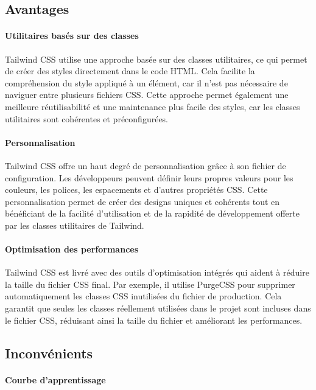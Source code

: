 \subsection{Avantages}

\paragraph{Utilitaires basés sur des classes}

Tailwind CSS utilise une approche basée sur des classes utilitaires, ce qui permet de créer des styles directement dans le code HTML. Cela facilite la compréhension du style appliqué à un élément, car il n'est pas nécessaire de naviguer entre plusieurs fichiers CSS. Cette approche permet également une meilleure réutilisabilité et une maintenance plus facile des styles, car les classes utilitaires sont cohérentes et préconfigurées.

\paragraph{Personnalisation}

Tailwind CSS offre un haut degré de personnalisation grâce à son fichier de configuration. Les développeurs peuvent définir leurs propres valeurs pour les couleurs, les polices, les espacements et d'autres propriétés CSS. Cette personnalisation permet de créer des designs uniques et cohérents tout en bénéficiant de la facilité d'utilisation et de la rapidité de développement offerte par les classes utilitaires de Tailwind.

\paragraph{Optimisation des performances}

Tailwind CSS est livré avec des outils d'optimisation intégrés qui aident à réduire la taille du fichier CSS final. Par exemple, il utilise PurgeCSS pour supprimer automatiquement les classes CSS inutilisées du fichier de production. Cela garantit que seules les classes réellement utilisées dans le projet sont incluses dans le fichier CSS, réduisant ainsi la taille du fichier et améliorant les performances.

\subsection{Inconvénients}

\paragraph{Courbe d'apprentissage}

